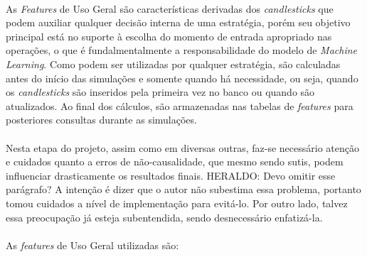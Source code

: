 \paragraph{} As \textit{Features} de Uso Geral são características derivadas dos \textit{candlesticks} que podem auxiliar qualquer decisão interna de uma estratégia, porém seu objetivo principal está no suporte à escolha do momento de entrada apropriado nas operações, o que é fundalmentalmente a responsabilidade do modelo de \textit{Machine Learning}. Como podem ser utilizadas por qualquer estratégia, são calculadas antes do início das simulações e somente quando há necessidade, ou seja, quando os \textit{candlesticks} são inseridos pela primeira vez no banco ou quando são atualizados. Ao final dos cálculos, são armazenadas nas tabelas de \textit{features} para posteriores consultas durante as simulações.

\paragraph{} Nesta etapa do projeto, assim como em diversas outras, faz-se necessário atenção e cuidados quanto a erros de não-causalidade, que mesmo sendo sutis, podem influenciar drasticamente os resultados finais. \color{red} HERALDO: Devo omitir esse parágrafo? A intenção é dizer que o autor não subestima essa problema, portanto tomou cuidados a nível de implementação para evitá-lo. Por outro lado, talvez essa preocupação já esteja subentendida, sendo desnecessário enfatizá-la. 

\paragraph{} As \textit{features} de Uso Geral utilizadas são:

